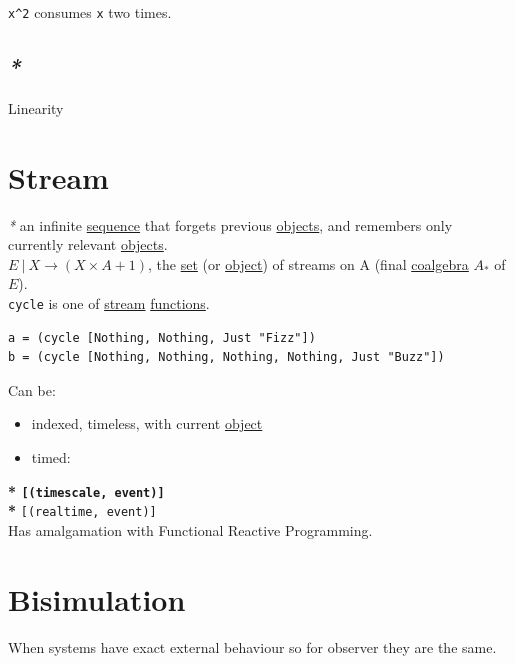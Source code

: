 \documentclass[a4paper,14pt,oneside]{book}
\begin{document}
\texttt{x\textasciicircum{}2} consumes \texttt{x} two times.\\

\section{\emph{*}}
\label{sec:orgb9c03d1}

\label{orgd7ea006}Linearity\\

\chapter{\label{org4ebbd3f}Stream}
\label{sec:orgf9b6eaa}
\emph{*} an infinite \hyperref[org8ff2c5c]{sequence} that forgets previous \hyperref[orgc973d87]{objects}, and remembers only currently relevant \hyperref[orgc973d87]{objects}.\\

\(E \ | \ X \to (X \times A + 1)\), the \hyperref[org2ca93d9]{set} (or \hyperref[org920c789]{object}) of streams on A (final \hyperref[org57eb143]{coalgebra} \(A_{*}\) of \(E\)).\\

\texttt{cycle} is one of \hyperref[org4ebbd3f]{stream} \hyperref[orgcfd72f2]{functions}.\\
\begin{verbatim}
a = (cycle [Nothing, Nothing, Just "Fizz"])
b = (cycle [Nothing, Nothing, Nothing, Nothing, Just "Buzz"])
\end{verbatim}

Can be:\\
\begin{itemize}
\item indexed, timeless, with current \hyperref[org920c789]{object}\\
\item timed:\\
\end{itemize}
\textbf{* \texttt{[(timescale, event)]}\\
*} \texttt{[(realtime, event)]}\\

Has amalgamation with Functional Reactive Programming.\\

\chapter{\label{org690ad09}Bisimulation}
\label{sec:org7d3d2f8}
When systems have exact external behaviour so for observer they are the same.\\
\end{document}

